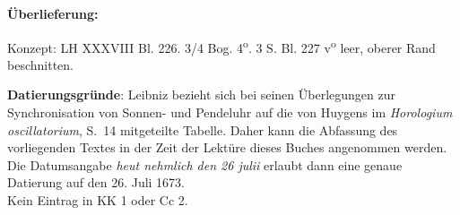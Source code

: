       
               
                \begin{ledgroupsized}[r]{120mm}
                \footnotesize 
                \pstart                
                \noindent\textbf{\"{U}berlieferung:}   
                \pend
                \end{ledgroupsized}
            
              
                            \begin{ledgroupsized}[r]{114mm}
                            \footnotesize 
                            \pstart \parindent -6mm
                            Konzept: LH XXXVIII Bl. 226. 3/4 Bog. 4\textsuperscript{o}. 3 S. Bl. 227 v\textsuperscript{o} leer, oberer Rand beschnitten.\pend
                            \end{ledgroupsized}
                \vspace*{5mm}
                \begin{ledgroup}
                \footnotesize 
                \pstart
            \noindent\footnotesize{\textbf{Datierungsgr\"{u}nde}: Leibniz bezieht sich bei seinen \"{U}berlegungen zur Synchronisation von Sonnen- und Pendeluhr auf die von Huygens im \cite{00123}\textit{Horologium oscillatorium}, S.~14 mitgeteilte Tabelle. Daher kann die Abfassung des vorliegenden Textes in der Zeit der Lekt\"{u}re dieses Buches angenommen werden. Die Datumsangabe \textit{heut nehmlich den 26 julii} erlaubt dann eine genaue Datierung auf den 26. Juli 1673.\\Kein Eintrag in KK 1 oder Cc 2.}
                \pend
                \end{ledgroup}
            
